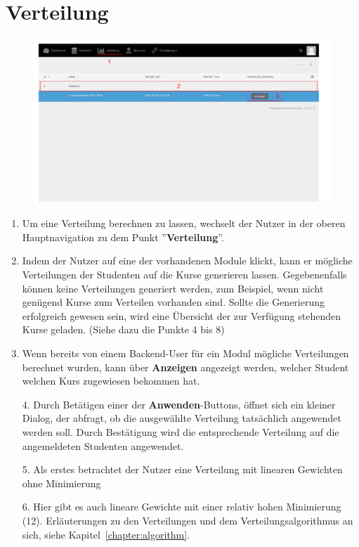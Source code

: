   
  \section{Verteilung}
  \label{section:distribution}
  
  \begin{figure}
  	\centering
  	\includegraphics[scale=0.5]{backend/img/distribution_1.pdf}
  \end{figure}
  
  \begin{enumerate}
   \item Um eine Verteilung berechnen zu lassen, wechselt der Nutzer in der oberen Hauptnavigation zu dem Punkt ''\textbf{Verteilung}''.
   \item Indem der Nutzer auf eine der vorhandenen Module klickt, kann er mögliche Verteilungen der Studenten auf die Kurse generieren lassen.
	 Gegebenenfalls können keine Verteilungen generiert werden, zum Beispiel, wenn nicht genügend Kurse zum Verteilen vorhanden sind.
	 Sollte die Generierung erfolgreich gewesen sein, wird eine Übersicht der zur Verfügung stehenden Kurse geladen. 
	 (Siehe dazu die Punkte 4 bis 8)
   \item Wenn bereits von einem Backend-User für ein Modul mögliche Verteilungen berechnet wurden, kann über \textbf{Anzeigen} angezeigt werden, welcher Student welchen Kurs zugewiesen bekommen hat.
  \end{enumerate}
  
  
  \begin{enumerate}
   \item[4.] Durch Betätigen einer der \textbf{Anwenden}-Buttons, öffnet sich ein kleiner Dialog, der abfragt, ob die ausgewählte Verteilung 
	    tatsächlich angewendet werden soll. Durch Bestätigung wird die entsprechende Verteilung auf die angemeldeten Studenten angewendet.  
   \item[5.] Als erstes betrachtet der Nutzer eine Verteilung mit linearen Gewichten ohne Minimierung
   \item[6.] Hier gibt es auch lineare Gewichte mit einer relativ hohen Minimierung (12). 
	     Erläuterungen zu den Verteilungen und dem Verteilungsalgorithmus an sich, siehe Kapitel~\ref{chapter:algorithm}. 
  \end{enumerate}

